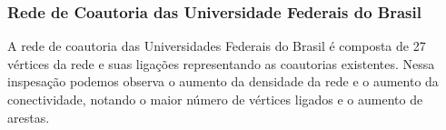 \documentclass[12pt]{article}
\begin{document}
\subsubsection{Rede de Coautoria das Universidade Federais do Brasil}

A rede de coautoria das Universidades Federais do Brasil é composta de 27 vértices da rede e suas ligações representando as coautorias existentes. Nessa inspesação podemos observa o aumento da densidade da rede e o aumento da conectividade, notando o maior número de vértices ligados e o aumento de arestas.



\end{document}
